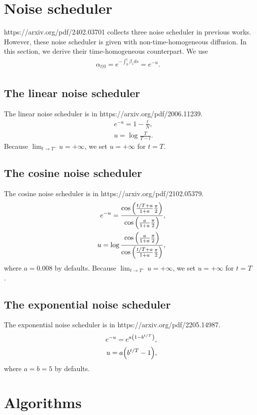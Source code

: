 \documentclass[10pt]{article}
\begin{document}
\section{Noise scheduler}

https://arxiv.org/pdf/2402.03701 collects three noise scheduler in previous works. However, these noise scheduler is given with non-time-homogeneous diffusion. In this section, we derive their time-homogeneous counterpart. We use
\begin{eqnarray*}
  \alpha_{t|0}= e^{-\int_0^t \beta_s ds} = e^{-u}.
\end{eqnarray*}

\subsection{The linear noise scheduler}
The linear noise scheduler is in https://arxiv.org/pdf/2006.11239.
\begin{eqnarray*}
  &&e^{-u} = 1 - \frac{t}{N},\\
  &&u = \log\frac{T}{T-t}.
\end{eqnarray*}
Because $\lim_{t\to T^-}u = +\infty$, we set $u=+\infty$ for $t=T$.

\subsection{The cosine noise scheduler}
The cosine noise scheduler is in https://arxiv.org/pdf/2102.05379.
\begin{eqnarray*}
  &&e^{-u} = \frac{\cos\qty(\frac{t/T+a}{1+a}\frac{\pi}{2})}{\cos\qty(\frac{a}{1+a}\frac{\pi}{2})},\\
  &&u = \log \frac{\cos\qty(\frac{a}{1+a}\frac{\pi}{2})}{\cos\qty(\frac{t/T+a}{1+a}\frac{\pi}{2})},
\end{eqnarray*}
where $a=0.008$ by defaults. Because $\lim_{t\to T^-}u = +\infty$, we set $u=+\infty$ for $t=T$.

\subsection{The exponential noise scheduler}
The exponential noise scheduler is in https://arxiv.org/pdf/2205.14987.
\begin{eqnarray*}
  &&e^{-u} = e^{a\qty(1-b^{t/T})},\\
  &&u = a\qty(b^{t/T} - 1),
\end{eqnarray*}
where $a=b=5$ by defaults.

\section{Algorithms}
\end{document}
